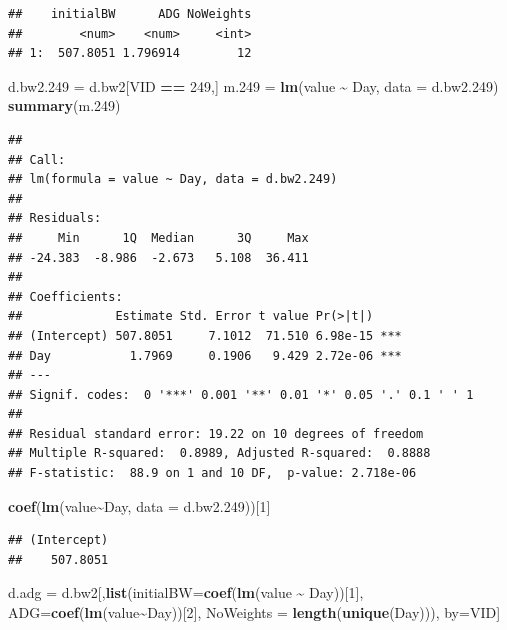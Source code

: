 \documentclass[
]{book}
\newenvironment{Shaded}{\begin{snugshade}}{\end{snugshade}}
\newcommand{\AttributeTok}[1]{\textcolor[rgb]{0.13,0.29,0.53}{#1}}
\newcommand{\DecValTok}[1]{\textcolor[rgb]{0.00,0.00,0.81}{#1}}
\newcommand{\FloatTok}[1]{\textcolor[rgb]{0.00,0.00,0.81}{#1}}
\newcommand{\FunctionTok}[1]{\textcolor[rgb]{0.13,0.29,0.53}{\textbf{#1}}}
\newcommand{\NormalTok}[1]{#1}
\newcommand{\OtherTok}[1]{\textcolor[rgb]{0.56,0.35,0.01}{#1}}
\newcommand{\SpecialCharTok}[1]{\textcolor[rgb]{0.81,0.36,0.00}{\textbf{#1}}}
\newcommand{\StringTok}[1]{\textcolor[rgb]{0.31,0.60,0.02}{#1}}
\begin{document}
\begin{verbatim}
##    initialBW      ADG NoWeights
##        <num>    <num>     <int>
## 1:  507.8051 1.796914        12
\end{verbatim}

\begin{Shaded}
\begin{Highlighting}[]
\NormalTok{d.bw2}\FloatTok{.249} \OtherTok{=}\NormalTok{ d.bw2[VID }\SpecialCharTok{==} \StringTok{\textquotesingle{}249\textquotesingle{}}\NormalTok{,]}
\NormalTok{m}\FloatTok{.249} \OtherTok{=} \FunctionTok{lm}\NormalTok{(value }\SpecialCharTok{\textasciitilde{}}\NormalTok{ Day, }\AttributeTok{data =}\NormalTok{ d.bw2}\FloatTok{.249}\NormalTok{)}
\FunctionTok{summary}\NormalTok{(m}\FloatTok{.249}\NormalTok{)}
\end{Highlighting}
\end{Shaded}

\begin{verbatim}
## 
## Call:
## lm(formula = value ~ Day, data = d.bw2.249)
## 
## Residuals:
##     Min      1Q  Median      3Q     Max 
## -24.383  -8.986  -2.673   5.108  36.411 
## 
## Coefficients:
##             Estimate Std. Error t value Pr(>|t|)    
## (Intercept) 507.8051     7.1012  71.510 6.98e-15 ***
## Day           1.7969     0.1906   9.429 2.72e-06 ***
## ---
## Signif. codes:  0 '***' 0.001 '**' 0.01 '*' 0.05 '.' 0.1 ' ' 1
## 
## Residual standard error: 19.22 on 10 degrees of freedom
## Multiple R-squared:  0.8989, Adjusted R-squared:  0.8888 
## F-statistic:  88.9 on 1 and 10 DF,  p-value: 2.718e-06
\end{verbatim}

\begin{Shaded}
\begin{Highlighting}[]
\FunctionTok{coef}\NormalTok{(}\FunctionTok{lm}\NormalTok{(value}\SpecialCharTok{\textasciitilde{}}\NormalTok{Day, }\AttributeTok{data =}\NormalTok{ d.bw2}\FloatTok{.249}\NormalTok{))[}\DecValTok{1}\NormalTok{]}
\end{Highlighting}
\end{Shaded}

\begin{verbatim}
## (Intercept) 
##    507.8051
\end{verbatim}

\begin{Shaded}
\begin{Highlighting}[]
\NormalTok{d.adg }\OtherTok{=}\NormalTok{ d.bw2[,}\FunctionTok{list}\NormalTok{(}\AttributeTok{initialBW=}\FunctionTok{coef}\NormalTok{(}\FunctionTok{lm}\NormalTok{(value }\SpecialCharTok{\textasciitilde{}}\NormalTok{ Day))[}\DecValTok{1}\NormalTok{], }
                    \AttributeTok{ADG=}\FunctionTok{coef}\NormalTok{(}\FunctionTok{lm}\NormalTok{(value}\SpecialCharTok{\textasciitilde{}}\NormalTok{Day))[}\DecValTok{2}\NormalTok{],}
                    \AttributeTok{NoWeights =} \FunctionTok{length}\NormalTok{(}\FunctionTok{unique}\NormalTok{(Day))),}
\NormalTok{              by}\OtherTok{=}\NormalTok{VID]}
\end{Highlighting}
\end{Shaded}
\end{document}
